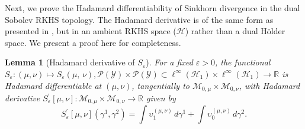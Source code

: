 \documentclass{article}
\theoremstyle{plain}
\newtheorem{lemma}[theorem]{Lemma}
\theoremstyle{definition}
\theoremstyle{remark}
\newcommand{\R}{\mathbb{R}}
\newcommand{\of}[1]{\left(#1\right)}
\newcommand{\cH}{\mathcal{H}}
\newcommand{\cP}{\mathcal{P}}
\newcommand{\cM}{\mathcal{M}}
\newcommand{\cY}{\mathcal{Y}}
\newcommand{\1}{\mathbbm{1}}
\newcommand{\SinkDiv}[2]{{S}_\eps\of{#1,\, #2}}
\newcommand{\eps}{\varepsilon}
\theoremstyle{plain}
\theoremstyle{definition}
\begin{document}
Next, we prove the Hadamard differentiability of Sinkhorn divergence in the dual Sobolev RKHS topology. The Hadamard derivative is of the same form as presented in \citet[Lem.~3]{goldfeld2024limit}, but in an ambient RKHS space ($\mathcal{H}$) rather than a dual H\"{o}lder space. We present a proof here for completeness.

\begin{lemma}[Hadamard derivative of $S_\eps$]\label{lem:Sinkhorn_first_order_Hadamard_diff}
    For a fixed $\eps > 0$, the functional $S_\eps: (\mu, \nu) \mapsto \SinkDiv{\mu}{\nu}, \cP(\cY) \times \cP(\cY) \subset \ell^\infty(\cH_1) \times \ell^\infty(\cH_1) \to \R$ is Hadamard differentiable at $(\mu, \nu)$, tangentially to $\cM_{0, \mu} \times \cM_{0, \nu}$, with Hadamard derivative $S_\eps^\prime[\mu, \nu]: \cM_{0, \mu} \times \cM_{0, \nu} \to \R$ given by
    \[
    S_\eps^\prime[\mu, \nu](\gamma^1, \gamma^2) = \int \upsilon_1^{(\mu, \nu)} \,d\gamma^1 + \int \upsilon_0^{(\mu, \nu)} \,d\gamma^2.
    \]
\end{lemma}
\end{document}
